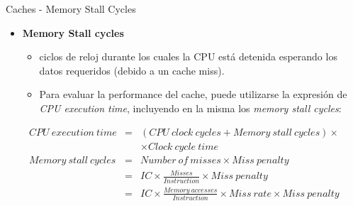 \documentclass{beamer}
\begin{document}
   \begin{frame}{Caches - Memory Stall Cycles}
    \begin{itemize}
      \item \textbf{Memory Stall cycles}
      \begin{itemize}
        \item ciclos de reloj durante los cuales la CPU
        está detenida esperando los datos requeridos (debido a un cache miss).
        \item Para evaluar la performance del cache, puede utilizarse la
	expresión de \emph{CPU execution time}, incluyendo en la misma los
	\emph{memory stall cycles}:
      \end{itemize}
    \end{itemize}
    
    \tiny
        \begin{eqnarray*}
        CPU\ execution\ time & = & (CPU\ clock\ cycles + Memory\ stall\ cycles)
        \times
        \nonumber\\
        & & \times Clock\ cycle\ time
        \nonumber\\
        Memory\ stall\ cycles & = & Number\ of\ misses \times Miss\ penalty
        \nonumber\\
        & = & IC \times \frac{Misses}{Instruction} \times Miss\ penalty
        \nonumber\\
        & = & IC \times \frac{Memory\ accesses}{Instruction} \times Miss\  
        rate \times Miss\ penalty
        \end{eqnarray*}
        
  \end{frame}
 
\end{document}
